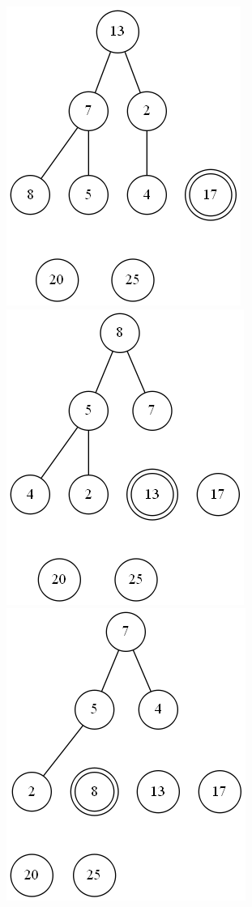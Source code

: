 \documentclass[a4paper]{article}
\begin{document}
\begin{enumerate}
\begin{changemargin}{-1cm}{-1cm}
\begin{center}
            \end{center}
            \vspace{0.5cm}
            \begin{center}
                \includegraphics[scale=0.3]{64-1d} \phantom{space}
                \includegraphics[scale=0.3]{64-1e} \phantom{space}
                \includegraphics[scale=0.3]{64-1f}

\end{center}
\end{changemargin}
\end{enumerate}
\end{document}
